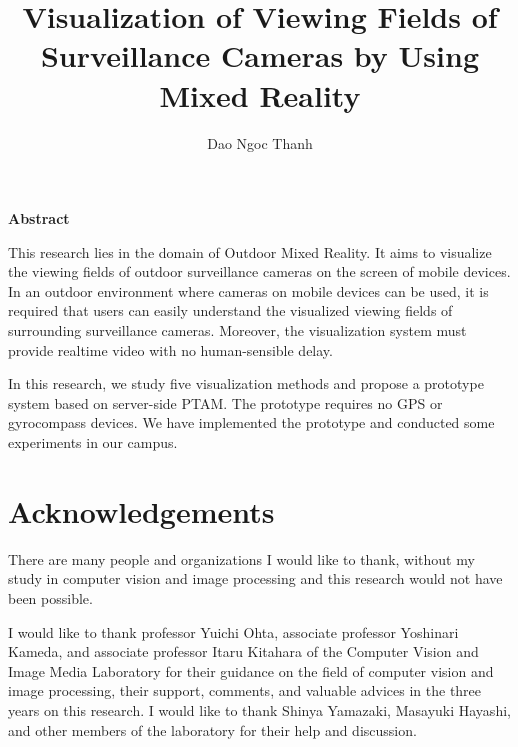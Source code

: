 \documentclass[a4paper,11pt]{report}
\title{Visualization of Viewing Fields of Surveillance Cameras by Using Mixed Reality}
\author{Dao Ngoc Thanh}
\begin{document}
\maketitle
\thispagestyle{empty}
\newpage

\thispagestyle{empty}
\vspace*{20pt plus 1fil}
\noindent
\begin{center}
{\bf Abstract}
\vspace{5mm}
\end{center}
This research lies in the domain of Outdoor Mixed Reality. It aims to visualize the viewing fields of outdoor surveillance cameras on the screen of mobile devices. In an outdoor environment where cameras on mobile devices can be used, it is required that users can easily understand the visualized viewing fields of surrounding surveillance cameras. Moreover, the visualization system must provide realtime video with no human-sensible delay.

In this research, we study five visualization methods and propose a prototype system based on server-side PTAM. The prototype requires no GPS or gyrocompass devices. We have implemented the prototype and conducted some experiments in our campus.

\par
\vspace{0pt plus 1fil}
\newpage

\tableofcontents
\listoffigures

\pagebreak \setcounter{page}{1}







\chapter*{Acknowledgements}

There are many people and organizations I would like to thank, without my study in computer vision and image processing and this research would not have been possible.

I would like to thank professor Yuichi Ohta, associate professor Yoshinari Kameda, and associate professor Itaru Kitahara of the Computer Vision and Image Media Laboratory for their guidance on the field of computer vision and image processing, their support, comments, and valuable advices in the three years on this research. I would like to thank Shinya Yamazaki, Masayuki Hayashi, and other members of the laboratory for their help and discussion.
\end{document}
